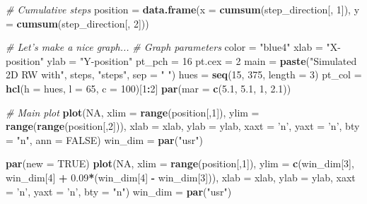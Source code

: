 \documentclass[12pt,]{krantz}
\newenvironment{Shaded}{\begin{snugshade}}{\end{snugshade}}
\newcommand{\KeywordTok}[1]{\textcolor[rgb]{0.27,0.27,0.27}{\textbf{#1}}}
\newcommand{\DataTypeTok}[1]{\textcolor[rgb]{0.27,0.27,0.27}{#1}}
\newcommand{\DecValTok}[1]{\textcolor[rgb]{0.06,0.06,0.06}{#1}}
\newcommand{\FloatTok}[1]{\textcolor[rgb]{0.06,0.06,0.06}{#1}}
\newcommand{\StringTok}[1]{\textcolor[rgb]{0.5,0.5,0.5}{#1}}
\newcommand{\CommentTok}[1]{\textcolor[rgb]{0.37,0.37,0.37}{\textit{#1}}}
\newcommand{\OtherTok}[1]{\textcolor[rgb]{0.37,0.37,0.37}{#1}}
\newcommand{\OperatorTok}[1]{\textcolor[rgb]{0.43,0.43,0.43}{\textbf{#1}}}
\newcommand{\NormalTok}[1]{#1}
\begin{document}
\begin{Shaded}
\begin{Highlighting}[]
\CommentTok{# Cumulative steps}
\NormalTok{position =}\StringTok{ }\KeywordTok{data.frame}\NormalTok{(}\DataTypeTok{x =} \KeywordTok{cumsum}\NormalTok{(step_direction[, }\DecValTok{1}\NormalTok{]), }
                      \DataTypeTok{y =} \KeywordTok{cumsum}\NormalTok{(step_direction[, }\DecValTok{2}\NormalTok{]))}
  
\CommentTok{# Let's make a nice graph...}
\CommentTok{# Graph parameters}
\NormalTok{color =}\StringTok{ "blue4"}
\NormalTok{xlab =}\StringTok{ "X-position"}
\NormalTok{ylab =}\StringTok{ "Y-position"}
\NormalTok{pt_pch =}\StringTok{ }\DecValTok{16}
\NormalTok{pt.cex =}\StringTok{ }\DecValTok{2}
\NormalTok{main =}\StringTok{ }\KeywordTok{paste}\NormalTok{(}\StringTok{"Simulated 2D RW with"}\NormalTok{, steps, }\StringTok{"steps"}\NormalTok{, }\DataTypeTok{sep =} \StringTok{" "}\NormalTok{)}
\NormalTok{hues =}\StringTok{ }\KeywordTok{seq}\NormalTok{(}\DecValTok{15}\NormalTok{, }\DecValTok{375}\NormalTok{, }\DataTypeTok{length =} \DecValTok{3}\NormalTok{)}
\NormalTok{pt_col =}\StringTok{ }\KeywordTok{hcl}\NormalTok{(}\DataTypeTok{h =}\NormalTok{ hues, }\DataTypeTok{l =} \DecValTok{65}\NormalTok{, }\DataTypeTok{c =} \DecValTok{100}\NormalTok{)[}\DecValTok{1}\OperatorTok{:}\DecValTok{2}\NormalTok{]}
\KeywordTok{par}\NormalTok{(}\DataTypeTok{mar =} \KeywordTok{c}\NormalTok{(}\FloatTok{5.1}\NormalTok{, }\FloatTok{5.1}\NormalTok{, }\DecValTok{1}\NormalTok{, }\FloatTok{2.1}\NormalTok{))}

\CommentTok{# Main plot}
\KeywordTok{plot}\NormalTok{(}\OtherTok{NA}\NormalTok{,  }\DataTypeTok{xlim =} \KeywordTok{range}\NormalTok{(position[,}\DecValTok{1}\NormalTok{]), }
          \DataTypeTok{ylim =} \KeywordTok{range}\NormalTok{(}\KeywordTok{range}\NormalTok{(position[,}\DecValTok{2}\NormalTok{])), }
          \DataTypeTok{xlab =}\NormalTok{ xlab, }\DataTypeTok{ylab =}\NormalTok{ ylab, }\DataTypeTok{xaxt =} \StringTok{'n'}\NormalTok{, }
          \DataTypeTok{yaxt =} \StringTok{'n'}\NormalTok{, }\DataTypeTok{bty =} \StringTok{"n"}\NormalTok{, }\DataTypeTok{ann =} \OtherTok{FALSE}\NormalTok{)}
\NormalTok{win_dim =}\StringTok{ }\KeywordTok{par}\NormalTok{(}\StringTok{"usr"}\NormalTok{)}

\KeywordTok{par}\NormalTok{(}\DataTypeTok{new =} \OtherTok{TRUE}\NormalTok{)}
\KeywordTok{plot}\NormalTok{(}\OtherTok{NA}\NormalTok{, }\DataTypeTok{xlim =} \KeywordTok{range}\NormalTok{(position[,}\DecValTok{1}\NormalTok{]), }\DataTypeTok{ylim =} \KeywordTok{c}\NormalTok{(win_dim[}\DecValTok{3}\NormalTok{], win_dim[}\DecValTok{4}\NormalTok{] }\OperatorTok{+}\StringTok{ }\FloatTok{0.09}\OperatorTok{*}\NormalTok{(win_dim[}\DecValTok{4}\NormalTok{] }\OperatorTok{-}\StringTok{ }\NormalTok{win_dim[}\DecValTok{3}\NormalTok{])),}
       \DataTypeTok{xlab =}\NormalTok{ xlab, }\DataTypeTok{ylab =}\NormalTok{ ylab, }\DataTypeTok{xaxt =} \StringTok{'n'}\NormalTok{, }\DataTypeTok{yaxt =} \StringTok{'n'}\NormalTok{, }\DataTypeTok{bty =} \StringTok{"n"}\NormalTok{)}
\NormalTok{  win_dim =}\StringTok{ }\KeywordTok{par}\NormalTok{(}\StringTok{"usr"}\NormalTok{)}


\end{Highlighting}
\end{Shaded}
\end{document}
